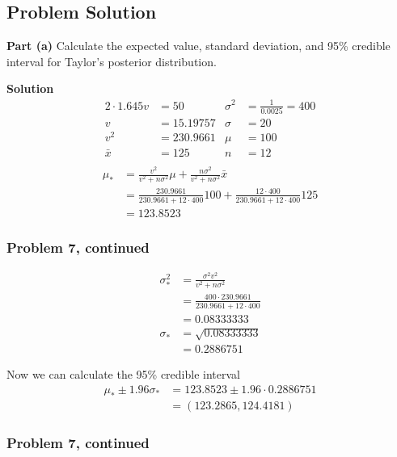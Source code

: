\documentclass[12pt]{article}
\theoremstyle{definition}
\begin{document}
\subsection*{Problem Solution}

\bigskip
\noindent
{\bf Part (a)} Calculate the expected value, standard deviation, and 95\% credible interval for Taylor's posterior distribution.

\bigskip
\noindent
{\bf Solution}
\begin{align*}
2\cdot 1.645v &= 50    &\sigma^2 &= \frac{1}{0.0025} = 400\\
v &= 15.19757    &\sigma &= 20\\
v^2 &= 230.9661    &\mu &= 100\\
\bar{x} &= 125    &n &= 12\\
\end{align*}
\begin{align*}
\mu_* &= \frac{v^2}{v^2 + n\sigma^2}\mu + \frac{n\sigma^2}{v^2 + n\sigma^2}\bar{x}\\
&= \frac{230.9661}{230.9661 + 12\cdot 400}100 + \frac{12\cdot400}{230.9661 + 12\cdot400}125\\
&= 123.8523
\end{align*}

\newpage
\subsubsection*{Problem 7, continued}
\begin{align*}
\sigma_*^2 &= \frac{\sigma^2 v^2}{v^2 + n\sigma^2}\\
&= \frac{400 \cdot 230.9661}{230.9661 + 12 \cdot 400}\\
&= 0.08333333\\
\sigma_* &= \sqrt{0.08333333}\\
&= 0.2886751
\end{align*}

Now we can calculate the 95\% credible interval
\begin{align*}
\mu_* \pm 1.96\sigma_* &= 123.8523 \pm 1.96\cdot 0.2886751\\
&= (123.2865, 124.4181)
\end{align*}

\newpage
\subsubsection*{Problem 7, continued}
\end{document}
